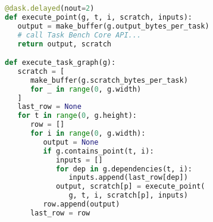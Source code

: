 \begin{lstlisting}[language=Python,caption={Excerpt from Task Bench implementation in Dask.},label={lst:code-sample},style=codeblock,float]
@dask.delayed(nout=2)
def execute_point(g, t, i, scratch, inputs):
   output = make_buffer(g.output_bytes_per_task)
   # call Task Bench Core API...
   return output, scratch

def execute_task_graph(g):
   scratch = [
      make_buffer(g.scratch_bytes_per_task)
      for _ in range(0, g.width)
   ]
   last_row = None
   for t in range(0, g.height):
      row = []
      for i in range(0, g.width):
         output = None
         if g.contains_point(t, i):
            inputs = []
            for dep in g.dependencies(t, i):
               inputs.append(last_row[dep])
            output, scratch[p] = execute_point(
               g, t, i, scratch[p], inputs)
         row.append(output)
      last_row = row
\end{lstlisting}

